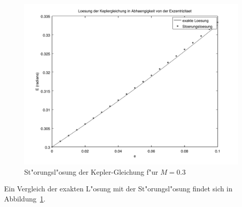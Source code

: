 \begin{loesung}
\begin{figure}
\includegraphics[width=\hsize]{uebungsaufgaben/kepler.pdf}
\caption{St"orungsl"osung der Kepler-Gleichung f"ur $M=0.3$
\label{10001:kepler}}
\end{figure}
Ein Vergleich der exakten L"osung mit der St"orungsl"osung findet sich
in Abbildung~\ref{10001:kepler}.
\end{loesung}

